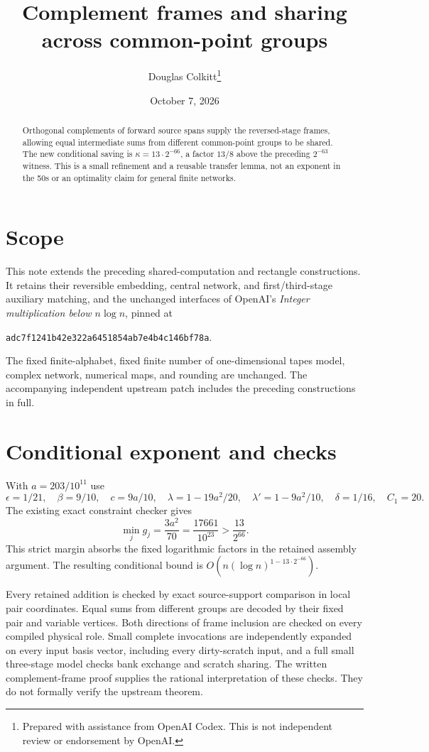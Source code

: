 \documentclass[11pt]{article}
\title{Complement frames and sharing across common-point groups}
\author{Douglas Colkitt\thanks{Prepared with assistance from OpenAI Codex.
This is not independent review or endorsement by OpenAI.}}
\date{October 7, 2026}
\begin{document}
\maketitle
\begin{abstract}
Orthogonal complements of forward source spans supply the reversed-stage
frames, allowing equal intermediate sums from different common-point groups
to be shared. The new conditional saving is $\kappa=13\cdot2^{-66}$,
a factor $13/8$ above the preceding $2^{-63}$ witness. This is a small
refinement and a reusable transfer lemma, not an exponent in the 50s or an
optimality claim for general finite networks.
\end{abstract}
\section{Scope}
This note extends the preceding shared-computation and rectangle constructions.
It retains their reversible embedding, central network, and first/third-stage
auxiliary matching, and the unchanged interfaces of OpenAI's
\emph{Integer multiplication below $n\log n$}, pinned at
\begin{center}\texttt{adc7f1241b42e322a6451854ab7e4b4c146bf78a}.\end{center}
The fixed finite-alphabet, fixed finite number of one-dimensional tapes model,
complex network, numerical maps, and rounding are unchanged. The accompanying
independent upstream patch includes the preceding constructions in full.

\section{Conditional exponent and checks}
With $a=203/10^{11}$ use
\[
 \epsilon=1/21,\quad \beta=9/10,\quad c=9a/10,\quad
 \lambda=1-19a^2/20,\quad\lambda'=1-9a^2/10,
 \quad\delta=1/16,\quad C_1=20.
\]
The existing exact constraint checker gives
\[
 \min_j g_j=\frac{3a^2}{70}
 =\frac{17661}{10^{23}}>\frac{13}{2^{66}}.
\]
This strict margin absorbs the fixed logarithmic factors in the retained
assembly argument. The resulting conditional bound is
$O(n(\log n)^{1-13\cdot2^{-66}})$.

Every retained addition is checked by exact source-support comparison in local
pair coordinates. Equal sums from different groups are decoded by their fixed
pair and variable vertices. Both directions of frame inclusion are checked on
every compiled physical role. Small complete invocations are independently
expanded on every input basis vector, including every dirty-scratch input,
and a full small three-stage model checks bank exchange and scratch sharing.
The written complement-frame proof supplies the rational interpretation of
these checks. They do not formally verify the upstream theorem.
\end{document}
